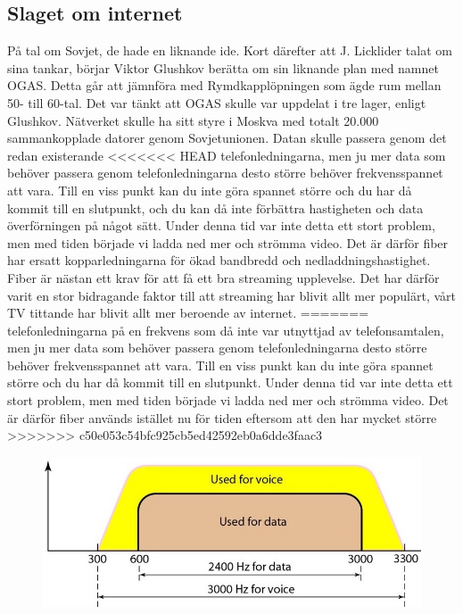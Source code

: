 \documentclass[a4paper,11pt]{article}
\begin{document}
\subsection{Slaget om internet}
På tal om Sovjet, de hade en liknande ide. Kort därefter att J. Licklider talat
om sina tankar, börjar Viktor Glushkov berätta om sin liknande plan med namnet
OGAS. Detta går att jämnföra med Rymdkapplöpningen som ägde rum mellan 50- till
60-tal. Det var tänkt att OGAS skulle var uppdelat i tre lager, enligt Glushkov.
Nätverket skulle ha sitt styre i Moskva med totalt 20.000 sammankopplade datorer
genom Sovjetunionen. Datan skulle passera genom det redan existerande
<<<<<<< HEAD
telefonledningarna, men ju mer data som behöver passera genom telefonledningarna
desto större behöver frekvensspannet att vara. Till en viss punkt kan du inte
göra spannet större och du har då kommit till en slutpunkt, och du kan då inte
förbättra hastigheten och data överförningen på något sätt. Under denna tid var
inte detta ett stort problem, men med tiden började vi ladda ned mer och strömma
video. Det är därför fiber har ersatt kopparledningarna för ökad bandbredd och
nedladdningshastighet. Fiber är nästan ett krav för att få ett bra streaming
upplevelse. Det har därför varit en stor bidragande faktor till att streaming
har blivit allt mer populärt, vårt TV tittande har blivit allt mer beroende av
internet.
=======
telefonledningarna på en frekvens som då inte var utnyttjad av telefonsamtalen,
men ju mer data som behöver passera genom telefonledningarna desto större
behöver frekvensspannet att vara. Till en viss punkt kan du inte göra spannet
större och du har då kommit till en slutpunkt. Under denna tid var inte detta
ett stort problem, men med tiden började vi ladda ned mer och strömma video. Det
är därför fiber används istället nu för tiden eftersom att den har mycket större
>>>>>>> c50e053c54bfc925cb5ed42592eb0a6dde3faac3

\begin{figure}
  \centering
  \includegraphics[width=1.0\linewidth]{Bilder/bandbredd.jpg}
\end{figure}
\end{document}
